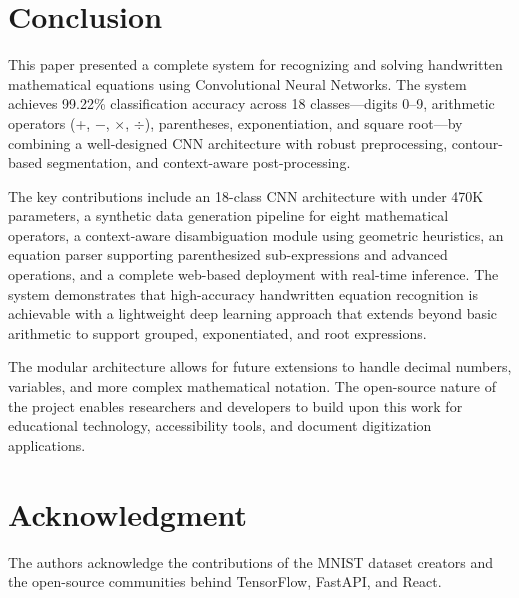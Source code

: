 \documentclass[conference]{IEEEtran}
\begin{document}
\section{Conclusion}

This paper presented a complete system for recognizing and solving handwritten mathematical equations using Convolutional Neural Networks. The system achieves 99.22\% classification accuracy across 18 classes---digits 0--9, arithmetic operators (+, $-$, $\times$, $\div$), parentheses, exponentiation, and square root---by combining a well-designed CNN architecture with robust preprocessing, contour-based segmentation, and context-aware post-processing.

The key contributions include an 18-class CNN architecture with under 470K parameters, a synthetic data generation pipeline for eight mathematical operators, a context-aware disambiguation module using geometric heuristics, an equation parser supporting parenthesized sub-expressions and advanced operations, and a complete web-based deployment with real-time inference. The system demonstrates that high-accuracy handwritten equation recognition is achievable with a lightweight deep learning approach that extends beyond basic arithmetic to support grouped, exponentiated, and root expressions.

The modular architecture allows for future extensions to handle decimal numbers, variables, and more complex mathematical notation. The open-source nature of the project enables researchers and developers to build upon this work for educational technology, accessibility tools, and document digitization applications.

\section*{Acknowledgment}

The authors acknowledge the contributions of the MNIST dataset creators and the open-source communities behind TensorFlow, FastAPI, and React.
\end{document}
